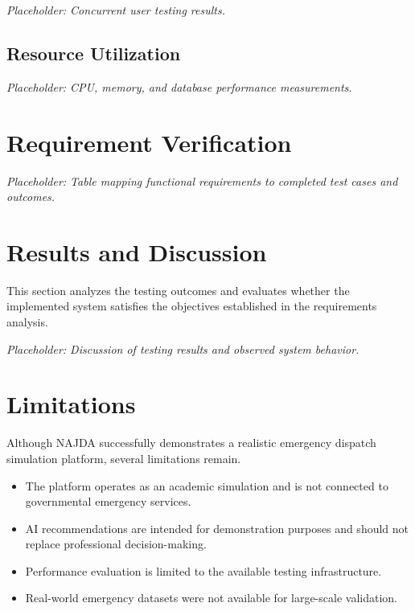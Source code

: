 \textit{Placeholder: Concurrent user testing results.}

\subsection{Resource Utilization}

\textit{Placeholder: CPU, memory, and database performance measurements.}


\section{Requirement Verification}

\textit{Placeholder: Table mapping functional requirements to completed test cases and outcomes.}


\section{Results and Discussion}

This section analyzes the testing outcomes and evaluates whether the implemented system satisfies the objectives established in the requirements analysis.

\textit{Placeholder: Discussion of testing results and observed system behavior.}


\section{Limitations}

Although NAJDA successfully demonstrates a realistic emergency dispatch simulation platform, several limitations remain.

\begin{itemize}
    \item The platform operates as an academic simulation and is not connected to governmental emergency services.
    \item AI recommendations are intended for demonstration purposes and should not replace professional decision-making.
    \item Performance evaluation is limited to the available testing infrastructure.
    \item Real-world emergency datasets were not available for large-scale validation.
\end{itemize}

